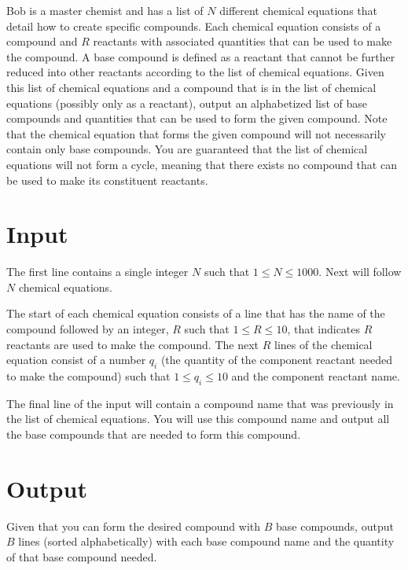 
Bob is a master chemist and has a list of $N$ different chemical equations that detail how to create specific
compounds. Each chemical equation consists of a compound and $R$ reactants with associated quantities that can 
be used to make the compound. A base compound is defined as a reactant that cannot be further reduced into other 
reactants according to the list of chemical equations. Given this list of chemical equations and a compound that
is in the list of chemical equations (possibly only as a reactant), output an alphabetized list of base compounds 
and quantities that can be used to form the given compound. Note that the chemical equation that forms the given 
compound will not necessarily contain only base compounds. You are guaranteed that the list of chemical equations
will not form a cycle, meaning  that there exists no compound that can be used to make its constituent reactants.

\section*{Input}
The first line contains a single integer $N$ such that $1 \leq N \leq 1000$.
Next will follow $N$ chemical equations. 

The start of each chemical equation consists of a line that has the name of the compound followed by an integer,
$R$ such that $1 \leq R \leq 10$, that indicates $R$ reactants are used to make the compound. The next $R$ 
lines of the chemical equation consist of a number $q_i$ (the quantity of the component reactant needed to make
the compound) such that $1 \leq q_i \leq 10$ and the component reactant name.

The final line of the input will contain a compound name that was previously in the list of chemical
equations. You will use this compound name and output all the base compounds that are needed to form 
this compound.

\section*{Output}
Given that you can form the desired compound with $B$ base compounds, output $B$ lines (sorted alphabetically)
with each base compound name and the quantity of that base compound needed.
